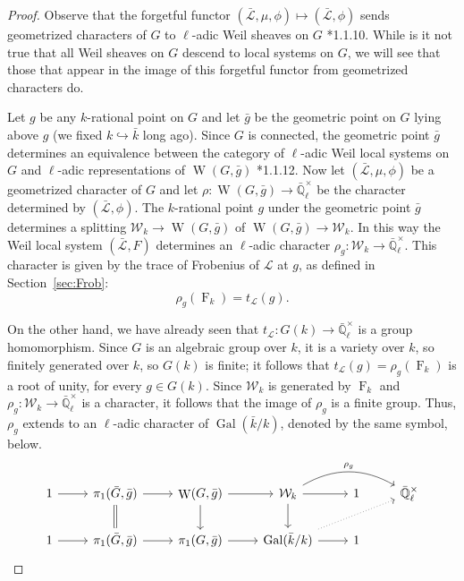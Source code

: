 \documentclass[11pt]{amsart}
\theoremstyle{plain}
\theoremstyle{definition}
\theoremstyle{remark}
\newcommand{\EE}{\mathbb{\bar Q}_\ell}
\newcommand{\bFq}{\bar{k}}
\newcommand{\Fq}{k}
\newcommand{\EEx}{\EE^\times}
\DeclareMathOperator{\Gal}{Gal}
\DeclareMathOperator{\W}{W}
\newcommand{\Frob}[1]{{\operatorname{F}_{#1}}}
\newcommand{\cs}[1]{{\mathcal{#1}}}
\newcommand{\gcs}[1]{{\mathcal{\bar #1}}}
\newcommand{\Weil}[1]{\mathcal{W}_{#1}}
\newcommand{\trFrob}[1]{t_{#1}}
\newcommand{\bg}{\bar{g}}
\newcommand{\bG}{\bar{G}}
\begin{document}
\begin{proof}
  Observe that the forgetful functor $(\gcs{L},\mu,\phi) \mapsto (\gcs{L},\phi)$
  sends geometrized characters of $G$ to $\ell$-adic Weil sheaves on $G$ \cite{Deligne:Weil2}*{1.1.10}.
  While is it not true that all Weil sheaves on $G$ descend to local systems on $G$, 
  we will see that those that appear in the image of this forgetful functor from geometrized characters do. 

  Let $g$ be any $\Fq$-rational point on $G$ 
  and let $\bg$ be the geometric point on $G$ lying above $g$ 
  (we fixed $\Fq \hookrightarrow \bFq$ long ago). 
  Since $G$ is connected, the geometric point $\bg$ determines
  an equivalence between the category of $\ell$-adic Weil local systems on $G$ and
  $\ell$-adic representations of $\W(G,\bg)$ \cite{Deligne:Weil2}*{1.1.12}. 
  Now let $(\gcs{L},\mu,\phi)$ be a geometrized character of $G$ 
  and let $\rho : \W(G, \bg) \to \EEx$ be the character determined by $(\gcs{L},\phi)$. 
  The $\Fq$-rational point $g$ under the geometric point $\bg$ determines a splitting
  $\Weil{\Fq}\to \W(G,\bg)$ of $\W(G,\bg)\to \Weil{\Fq}$. 
  In this way the Weil local system $(\gcs{L},F)$ determines an $\ell$-adic character $\rho_g : \Weil{\Fq} \to \EEx$.
  This character is given by the trace of Frobenius of $\cs{L}$ at $g$, as defined in Section~\ref{sec:Frob}:
  \[
  \rho_g(\Frob{\Fq}) =  \trFrob{\cs{L}}(g).
  \]
  
  On the other hand, we have already seen that $\trFrob{\cs{L}} : G(\Fq) \to \EEx$
  is a group homomorphism. Since $G$ is an algebraic group over $\Fq$, it is a
  variety over $\Fq$, so finitely generated over $\Fq$, so $G(\Fq)$ is finite;
  it follows that $\trFrob{\cs{L}}(g) = \rho_g(\Frob{\Fq})$ is a root of unity,
  for every $g\in G(\Fq)$.  Since $\Weil{\Fq}$ is generated by
  $\Frob{\Fq}$ and $\rho_g : \Weil{\Fq} \to \EEx$ is
  a character, it follows that the image of $\rho_g$ is a finite group.
  Thus, $\rho_g$ extends to an $\ell$-adic character of $\Gal(\bFq/\Fq)$, 
  denoted by the same symbol, below.
  \[
  \begin{tikzcd}
  1 \rar & \ar[equal]{d} \pi_1(\bG, \bg) \rar & \W(G,\bg) \rar \dar & \Weil{\Fq} \arrow[bend left]{rr}{\rho_g} \rar \dar & 1 & \EEx\\
  1 \rar &  \pi_1(\bG, \bg) \rar & \pi_1(G,\bg) \rar & \Gal(\bFq/\Fq) \arrow[dotted]{rru} \rar & 1 &
  \end{tikzcd}
  \]


\end{proof}
\end{document}
